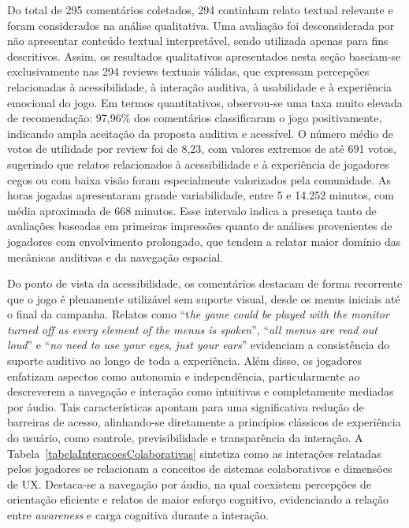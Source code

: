 \documentclass[12pt]{article}
\begin{document}
{{Do total de 295 comentários coletados, 294 continham relato textual relevante e foram considerados na análise qualitativa. Uma avaliação foi desconsiderada por não apresentar conteúdo textual interpretável, sendo utilizada apenas para fins descritivos. Assim, os resultados qualitativos apresentados nesta seção baseiam-se exclusivamente nas 294 reviews textuais válidas, que expressam percepções relacionadas à acessibilidade, à interação auditiva, à usabilidade e à experiência emocional do jogo. Em termos quantitativos, observou-se uma taxa muito elevada de recomendação: 97,96\% dos comentários classificaram o jogo positivamente, indicando ampla aceitação da proposta auditiva e acessível. O número médio de votos de utilidade por review foi de 8,23, com valores extremos de até 691 votos, sugerindo que relatos relacionados à acessibilidade e à experiência de jogadores cegos ou com baixa visão foram especialmente valorizados pela comunidade. As horas jogadas apresentaram grande variabilidade, entre 5 e 14.252 minutos, com média aproximada de 668 minutos. Esse intervalo indica a presença tanto de avaliações baseadas em primeiras impressões quanto de análises provenientes de jogadores com envolvimento prolongado, que tendem a relatar maior domínio das mecânicas auditivas e da navegação espacial.

Do ponto de vista da acessibilidade, os comentários destacam de forma recorrente que o jogo é plenamente utilizável sem suporte visual, desde os menus iniciais até o final da campanha. Relatos como “t\textit{he game could be played with the monitor turned off as every element of the menus is spoken}”, “\textit{all menus are read out loud}” e “\textit{no need to use your eyes}, \textit{just your ears}” evidenciam a consistência do suporte auditivo ao longo de toda a experiência. Além disso, os jogadores enfatizam aspectos como autonomia e independência, particularmente ao descreverem a navegação e interação como intuitivas e completamente mediadas por áudio. Tais características apontam para uma significativa redução de barreiras de acesso, alinhando-se diretamente a princípios clássicos de experiência do usuário, como controle, previsibilidade e transparência da interação. A Tabela~\ref{tabelaInteracoesColaborativas} sintetiza como as interações relatadas pelos jogadores se relacionam a conceitos de sistemas colaborativos e dimensões de UX. Destaca-se a navegação por áudio, na qual coexistem percepções de orientação eficiente e relatos de maior esforço cognitivo, evidenciando a relação entre \textit{awareness} e carga cognitiva durante a interação.


}}
\end{document}
